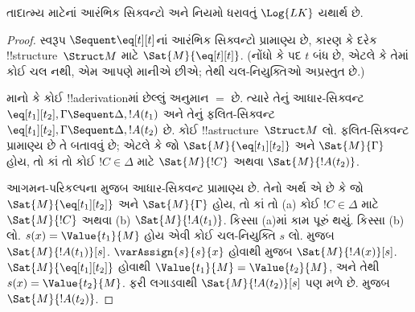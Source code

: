 \documentclass[../../../include/open-logic-section]{subfiles}
\begin{document}


\begin{prop}
તાદાત્મ્ય માટેનાં આરંભિક સિક્વન્ટો અને નિયમો ધરાવતું $\Log{LK}$ યથાર્થ છે.
\end{prop}

\begin{proof}
સ્વરૂપ ${} \Sequent \eq[t][t]$નાં આરંભિક સિક્વન્ટો પ્રામાણ્ય છે, કારણ
કે દરેક !!{structure}~$\Struct M$ માટે $\Sat{M}{\eq[t][t]}$. (નોંધો કે
પદ $t$ બંધ છે, એટલે કે તેમાં કોઈ ચલ નથી, એમ આપણે માનીએ છીએ; તેથી
ચલ-નિયુક્તિઓ અપ્રસ્તુત છે.)

માનો કે કોઈ !!a{derivation}માં છેલ્લું અનુમાન $=$ છે. ત્યારે તેનું
આધાર-સિક્વન્ટ $\eq[t_1][t_2], \Gamma \Sequent \Delta, !A(t_1)$ અને
તેનું ફલિત-સિક્વન્ટ
$\eq[t_1][t_2], \Gamma \Sequent \Delta, !A(t_2)$ છે. કોઈ
!!a{structure}~$\Struct M$ લો. ફલિત-સિક્વન્ટ પ્રામાણ્ય છે તે બતાવવું છે;
એટલે કે જો $\Sat{M}{\eq[t_1][t_2]}$ અને $\Sat{M}{\Gamma}$ હોય, તો કાં
તો કોઈ $!C \in \Delta$ માટે $\Sat{M}{!C}$ અથવા $\Sat{M}{!A(t_2)}$.

આગમન-પરિકલ્પના મુજબ આધાર-સિક્વન્ટ પ્રામાણ્ય છે. તેનો અર્થ એ છે કે જો
$\Sat{M}{\eq[t_1][t_2]}$ અને $\Sat{M}{\Gamma}$ હોય, તો કાં તો
(a) કોઈ $!C \in \Delta$ માટે $\Sat{M}{!C}$ અથવા
(b) $\Sat{M}{!A(t_1)}$. કિસ્સા (a)માં કામ પૂરું થયું. કિસ્સા (b) લો.
$s(x) = \Value{t_1}{M}$ હોય એવી કોઈ ચલ-નિયુક્તિ $s$ લો.
 મુજબ
$\Sat{M}{!A(t_1)}[s]$. $\varAssign{s}{s}{x}$ હોવાથી
 મુજબ $\Sat{M}{!A(x)}[s]$.
$\Sat{M}{\eq[t_1][t_2]}$ હોવાથી
$\Value{t_1}{M} = \Value{t_2}{M}$, અને તેથી
$s(x) = \Value{t_2}{M}$.  ફરી
લગાડવાથી $\Sat{M}{!A(t_2)}[s]$ પણ મળે છે.
 મુજબ $\Sat{M}{!A(t_2)}$.
\end{proof}
\end{document}
